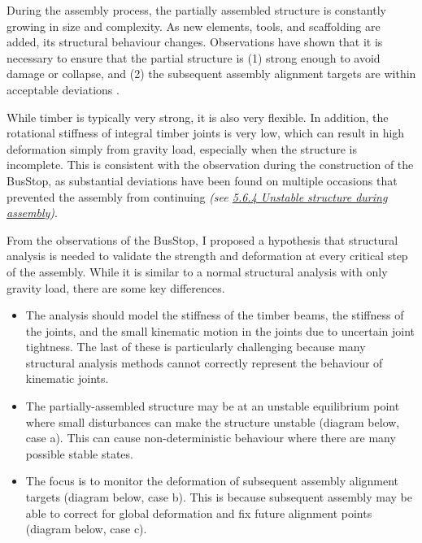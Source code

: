 During the assembly process, the partially assembled structure is constantly growing in size and complexity. As new elements, tools, and scaffolding are added, its structural behaviour changes. Observations have shown that it is necessary to ensure that the partial structure is (1) strong enough to avoid damage or collapse, and (2) the subsequent assembly alignment targets are within acceptable deviations . 

While timber is typically very strong, it is also very flexible. In addition, the rotational stiffness of integral timber joints is very low, which can result in high deformation simply from gravity load, especially when the structure is incomplete. This is consistent with the observation during the construction of the BusStop, as substantial deviations have been found on multiple occasions that prevented the assembly from continuing \textit{(see \ul{5.6.4 Unstable structure during assembly})}. 

From the observations of the BusStop, I proposed a hypothesis that structural analysis is needed to validate the strength and deformation at every critical step of the assembly. While it is similar to a normal structural analysis with only gravity load, there are some key differences. 

\begin{itemize}
	\item The analysis should model the stiffness of the timber beams, the stiffness of the joints, and the small kinematic motion in the joints due to uncertain joint tightness. The last of these is particularly challenging because many structural analysis methods cannot correctly represent the behaviour of kinematic joints. 

	\item The partially-assembled structure may be at an unstable equilibrium point where small disturbances can make the structure unstable (diagram below, case a). This can cause non-deterministic behaviour where there are many possible stable states.

	\item The focus is to monitor the deformation of subsequent assembly alignment targets (diagram below, case b). This is because subsequent assembly may be able to correct for global deformation and fix future alignment points (diagram below, case c).

\end{itemize}


